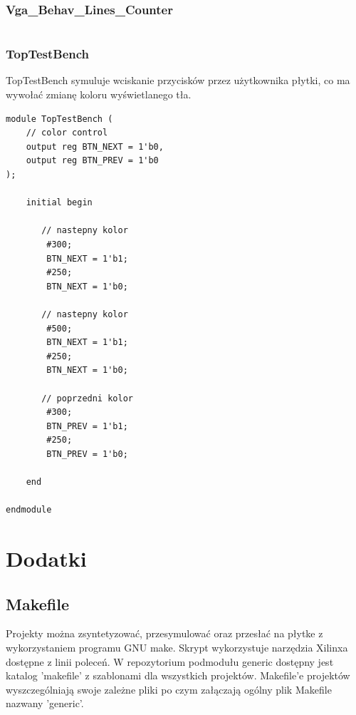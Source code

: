 \documentclass[a4paper,12pt]{article}
\begin{document}
\subsubsection{Vga\_Behav\_Lines\_Counter}

\begin{lstlisting}[label=Syncvga,caption=Sync.v,firstnumber=56]

\end{lstlisting}


\subsubsection{TopTestBench}

TopTestBench symuluje wciskanie przycisków przez użytkownika płytki, co ma wywołać zmianę koloru wyświetlanego tła.
\begin{lstlisting}[label=Syncvga,caption=Sync.v]
module TopTestBench (
    // color control
    output reg BTN_NEXT = 1'b0,
    output reg BTN_PREV = 1'b0
);

    initial begin

       // nastepny kolor
        #300;
        BTN_NEXT = 1'b1;
        #250;
        BTN_NEXT = 1'b0;

       // nastepny kolor
        #500;
        BTN_NEXT = 1'b1;
        #250;
        BTN_NEXT = 1'b0;

       // poprzedni kolor
        #300;
        BTN_PREV = 1'b1;
        #250;
        BTN_PREV = 1'b0;

    end

endmodule
\end{lstlisting}

\section{Dodatki}

\subsection{Makefile}

Projekty można zsyntetyzować, przesymulować oraz przesłać na płytke z wykorzystaniem programu GNU make. Skrypt wykorzystuje narzędzia Xilinxa dostępne z linii poleceń. W repozytorium podmodułu generic dostępny jest katalog 'makefile' z szablonami dla wszystkich projektów. Makefile'e projektów wyszczególniają swoje zależne pliki po czym załączają ogólny plik Makefile nazwany 'generic'.





\end{document}
